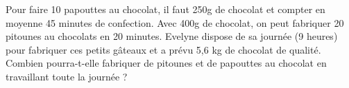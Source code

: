 
Pour faire 10 papouttes au chocolat, il faut 250g de chocolat et compter en moyenne 45 minutes de confection. Avec 400g de chocolat, on peut fabriquer 20 pitounes au chocolats en 20 minutes. Evelyne dispose de sa journée (9 heures) pour fabriquer ces petits gâteaux et a prévu 5,6 kg de chocolat de qualité.
Combien pourra-t-elle fabriquer de pitounes et de papouttes au chocolat en travaillant toute la journée ?